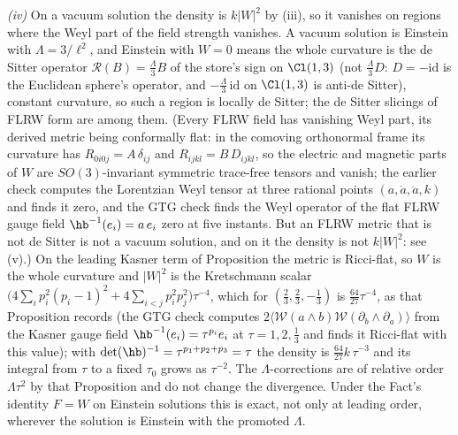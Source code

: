 \emph{(iv)} On a vacuum solution the density is $k|W|^{2}$ by (iii), so it vanishes on regions where the Weyl part of the field strength vanishes. A vacuum solution is Einstein with $\Lambda = 3/\ell^{2}$, and Einstein with $W = 0$ means the whole curvature is the de Sitter operator $\mathcal{R}(B) = \tfrac{\Lambda}{3}B$ of the store's sign on $\Cl(1,3)$ (not $\tfrac{\Lambda}{3}D$: $D = -\mathrm{id}$ is the Euclidean sphere's operator, and $-\tfrac{\Lambda}{3}\,\mathrm{id}$ on $\Cl(1,3)$ is anti-de Sitter), constant curvature, so such a region is locally de Sitter; the de Sitter slicings of FLRW form are among them. (Every FLRW field has vanishing Weyl part, its derived metric being conformally flat: in the comoving orthonormal frame its curvature has $R_{0i0j} = A\,\delta_{ij}$ and $R_{ijkl} = B\,D_{ijkl}$, so the electric and magnetic parts of $W$ are $SO(3)$-invariant symmetric trace-free tensors and vanish; the earlier check computes the Lorentzian Weyl tensor at three rational points $(a, \dot a, \ddot a, k)$ and finds it zero, and the GTG check finds the Weyl operator of the flat FLRW gauge field $\hb^{-1}(e_{i}) = a\,e_{i}$ zero at five instants. But an FLRW metric that is not de Sitter is not a vacuum solution, and on it the density is not $k|W|^{2}$: see (v).) On the leading Kasner term of Proposition  the metric is Ricci-flat, so $W$ is the whole curvature and $|W|^{2}$ is the Kretschmann scalar $\bigl(4\sum_{i}p_{i}^{2}(p_{i} - 1)^{2} + 4\sum_{i<j}p_{i}^{2}p_{j}^{2}\bigr)\tau^{-4}$, which for $(\tfrac23, \tfrac23, -\tfrac13)$ is $\tfrac{64}{27}\tau^{-4}$, as that Proposition records (the GTG check computes $2\langle\mathcal{W}(a\wedge b)\mathcal{W}(\partial_{b}\wedge\partial_{a})\rangle$ from the Kasner gauge field $\hb^{-1}(e_{i}) = \tau^{p_{i}}e_{i}$ at $\tau = 1, 2, \tfrac13$ and finds it Ricci-flat with this value); with $\det(\hb)^{-1} = \tau^{p_{1}+p_{2}+p_{3}} = \tau$ the density is $\tfrac{64}{27}k\,\tau^{-3}$ and its integral from $\tau$ to a fixed $\tau_{0}$ grows as $\tau^{-2}$. The $\Lambda$-corrections are of relative order $\Lambda\tau^{2}$ by that Proposition and do not change the divergence. Under the Fact's identity $F = W$ on Einstein solutions this is exact, not only at leading order, wherever the solution is Einstein with the promoted $\Lambda$.

